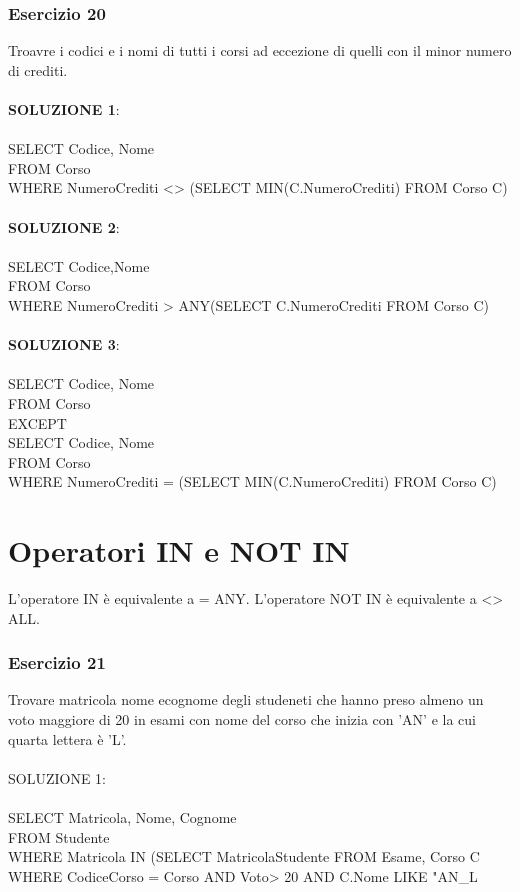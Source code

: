 \documentclass{article}
\begin{document}
\subsubsection{Esercizio 20}
Troavre i codici e i nomi di tutti i corsi ad eccezione di quelli con il minor numero di crediti.\\
\\
\textbf{SOLUZIONE 1}:\\
\\
SELECT Codice, Nome\\
FROM Corso\\
WHERE NumeroCrediti <> (SELECT MIN(C.NumeroCrediti) FROM Corso C)\\
\\
\textbf{SOLUZIONE 2}:\\
\\
SELECT Codice,Nome\\
FROM Corso\\
WHERE NumeroCrediti > ANY(SELECT C.NumeroCrediti FROM Corso C)\\
\\
\textbf{SOLUZIONE 3}:\\
\\
SELECT Codice, Nome\\
FROM Corso\\ 
EXCEPT\\
SELECT Codice, Nome\\
FROM Corso\\
WHERE NumeroCrediti = (SELECT MIN(C.NumeroCrediti) FROM Corso C)\\

\section{Operatori IN e NOT IN}
L'operatore IN è equivalente a = ANY.
L'operatore NOT IN è equivalente a <> ALL.

\subsubsection{Esercizio 21}
Trovare matricola nome  ecognome degli studeneti che hanno preso almeno un voto maggiore di 20 in esami con nome del corso che inizia con 'AN' e la cui quarta lettera è 'L'.\\
\\
SOLUZIONE 1:\\
\\
SELECT Matricola, Nome, Cognome\\
FROM Studente\\
WHERE Matricola IN (SELECT MatricolaStudente FROM Esame, Corso C WHERE CodiceCorso = Corso AND Voto> 20 AND C.Nome LIKE "AN_L%
\end{document}
